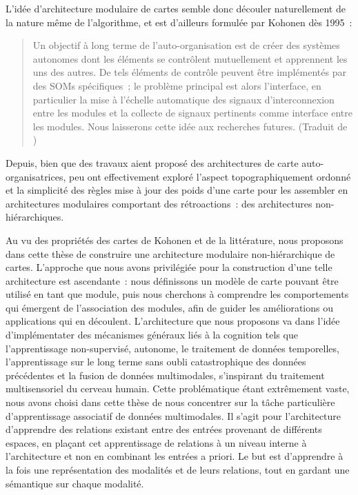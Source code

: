 L'idée d'architecture modulaire de cartes semble donc découler naturellement de la nature même de l'algorithme, et est d'ailleurs formulée par Kohonen dès 1995~:
\begin{quote}
\og Un objectif à long terme de l'auto-organisation est de créer des systèmes autonomes dont les éléments se contrôlent mutuellement et apprennent les uns des autres. De tels éléments de contrôle peuvent être implémentés par des SOMs spécifiques~; le problème principal est alors l'interface, en particulier la mise à l'échelle automatique des signaux d'interconnexion entre les modules et la collecte de signaux pertinents comme interface entre les modules. Nous laisserons cette idée aux recherches futures. \fg{}
(Traduit de \cite{Kohonen1995SelfOrganizingM})
\end{quote}

Depuis, bien que des travaux aient proposé des architectures de carte auto-organisatrices, peu ont effectivement exploré l'aspect topographiquement ordonné et la simplicité des règles mise à jour des poids d'une carte pour les assembler en architectures modulaires comportant des rétroactions~: des architectures non-hiérarchiques.

Au vu des propriétés des cartes de Kohonen et de la littérature, nous proposons dans cette thèse de construire une architecture modulaire non-hiérarchique de cartes.
L'approche que nous avons privilégiée pour la construction d'une telle architecture est ascendante~: nous définissons un modèle de carte pouvant être utilisé en tant que module, puis nous cherchons à comprendre les comportements qui émergent de l'association des modules, afin de guider les améliorations ou applications qui en découlent.
L'architecture que nous proposons va dans l'idée d'implémentater des mécanismes généraux liés à la cognition tels que l'apprentissage non-supervisé, autonome, le traitement de données temporelles, l'apprentissage sur le long terme sans oubli catastrophique des données précédentes et la fusion de données multimodales, s'inspirant du traitement multisensoriel du cerveau humain.
Cette problématique étant extrêmement vaste, nous avons choisi dans cette thèse de nous concentrer sur la tâche particulière d'apprentissage associatif de données multimodales. 
Il s'agit pour l'architecture d'apprendre des relations existant entre des entrées provenant de différents espaces, en plaçant cet apprentissage de relations à un niveau interne à l'architecture et non en combinant les entrées a priori. Le but est d'apprendre à la fois une représentation des modalités et de leurs relations, tout en gardant une sémantique sur chaque modalité.

